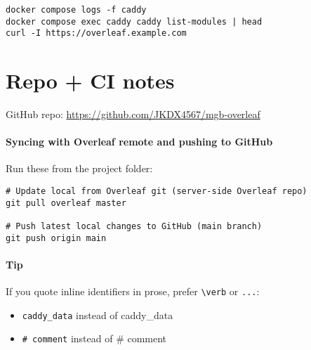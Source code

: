 \begin{verbatim}
docker compose logs -f caddy
docker compose exec caddy caddy list-modules | head
curl -I https://overleaf.example.com
\end{verbatim}

\section*{Repo + CI notes}
GitHub repo: \url{https://github.com/JKDX4567/mgb-overleaf}

\paragraph{Syncing with Overleaf remote and pushing to GitHub}
Run these from the project folder:
\begin{verbatim}
# Update local from Overleaf git (server-side Overleaf repo)
git pull overleaf master

# Push latest local changes to GitHub (main branch)
git push origin main
\end{verbatim}

\paragraph{Tip}
If you quote inline identifiers in prose, prefer \verb|\verb| or \texttt{...}:
\begin{itemize}[leftmargin=*]
  \item \verb|caddy_data| instead of caddy\_data
  \item \verb|# comment| instead of \# comment
\end{itemize}
